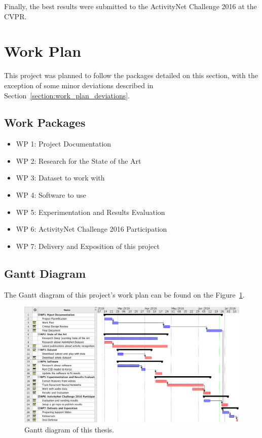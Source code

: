 Finally, the best results were submitted to the ActivityNet Challenge 2016 at the CVPR.

\section{Work Plan}

This project was planned to follow the packages detailed on this section, with the exception of some minor deviations described in Section~\ref{section:work_plan_deviations}.

\subsection{Work Packages}

\begin{itemize}
    \item WP 1: Project Documentation
    \item WP 2: Research for the State of the Art
    \item WP 3: Dataset to work with
    \item WP 4: Software to use
    \item WP 5: Experimentation and Results Evaluation
    \item WP 6: ActivityNet Challenge 2016 Participation
    \item WP 7: Delivery and Exposition of this project
\end{itemize}

\subsection{Gantt Diagram}

The Gantt diagram of this project's work plan can be found on the Figure~\ref{fig:gantt_diagram}.

\begin{figure}[H]
\begin{center}
\includegraphics[width=1\linewidth]{img/introduction/gantt_diagram}
\end{center}
\caption{Gantt diagram of this thesis.}
\label{fig:gantt_diagram}
\end{figure}


